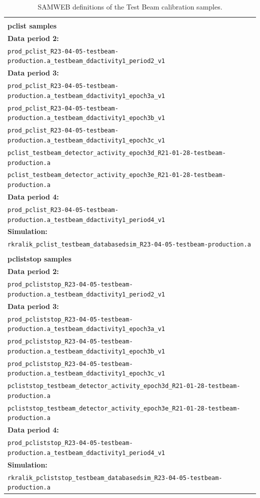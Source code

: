 \documentclass[12pt,a4paper]{article}
\begin{document}
\begin{table}[!ht]
\centering
\hspace*{-8mm}
\begin{tabular}{l}
\hline\hline\\
\textbf{pclist samples}\\[3pt]\hline
\textbf{Data period 2:}\\
\texttt{prod\_pclist\_R23-04-05-testbeam-production.a\_testbeam\_ddactivity1\_period2\_v1}\\
\textbf{Data period 3:}\\
\texttt{prod\_pclist\_R23-04-05-testbeam-production.a\_testbeam\_ddactivity1\_epoch3a\_v1}\\
\texttt{prod\_pclist\_R23-04-05-testbeam-production.a\_testbeam\_ddactivity1\_epoch3b\_v1}\\
\texttt{prod\_pclist\_R23-04-05-testbeam-production.a\_testbeam\_ddactivity1\_epoch3c\_v1}\\
\texttt{pclist\_testbeam\_detector\_activity\_epoch3d\_R21-01-28-testbeam-production.a}\\
\texttt{pclist\_testbeam\_detector\_activity\_epoch3e\_R21-01-28-testbeam-production.a}\\
\textbf{Data period 4:}\\
\texttt{prod\_pclist\_R23-04-05-testbeam-production.a\_testbeam\_ddactivity1\_period4\_v1}\\
\textbf{Simulation:}\\
\texttt{rkralik\_pclist\_testbeam\_databasedsim\_R23-04-05-testbeam-production.a}\\[5pt]
\hline\hline\\
\textbf{pcliststop samples}\\[3pt]\hline
\textbf{Data period 2:}\\
\texttt{prod\_pcliststop\_R23-04-05-testbeam-production.a\_testbeam\_ddactivity1\_period2\_v1}\\
\textbf{Data period 3:}\\
\texttt{prod\_pcliststop\_R23-04-05-testbeam-production.a\_testbeam\_ddactivity1\_epoch3a\_v1}\\
\texttt{prod\_pcliststop\_R23-04-05-testbeam-production.a\_testbeam\_ddactivity1\_epoch3b\_v1}\\
\texttt{prod\_pcliststop\_R23-04-05-testbeam-production.a\_testbeam\_ddactivity1\_epoch3c\_v1}\\
\texttt{pcliststop\_testbeam\_detector\_activity\_epoch3d\_R21-01-28-testbeam-production.a}\\
\texttt{pcliststop\_testbeam\_detector\_activity\_epoch3e\_R21-01-28-testbeam-production.a}\\
\textbf{Data period 4:}\\
\texttt{prod\_pcliststop\_R23-04-05-testbeam-production.a\_testbeam\_ddactivity1\_period4\_v1}\\
\textbf{Simulation:}\\
\texttt{rkralik\_pcliststop\_testbeam\_databasedsim\_R23-04-05-testbeam-production.a}\\[5pt]
\hline\hline
\end{tabular}
\caption{SAMWEB definitions of the Test Beam calibration samples.}
\label{tabTBCalibrationDefinitions}
\end{table}
\end{document}
